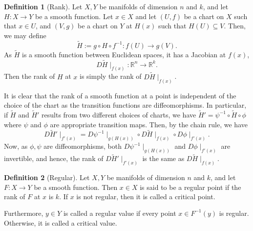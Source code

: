 \documentclass[]{article}
\theoremstyle{definition}
\theoremstyle{definition}
\newtheorem{definition}{Definition}[section]
\begin{document}
\begin{definition}[Rank]
  Let \(X, Y\) be manifolds of dimension \(n\) and \(k\), and let \(H : X \to Y\) 
  be a smooth function. Let \(x \in X\) and let \((U, f)\) be a chart on \(X\) 
  such that \(x \in U\), and \((V, g)\) be a chart on \(Y\) at \(H(x)\) such 
  that \(H(U) \subseteq V\). Then, we may define 
  \[\tilde H := g \circ H \circ f^{-1} : f(U) \to g(V).\]
  As \(\tilde H\) is a smooth function between Euclidean spaces, it has 
  a Jacobian at \(f(x)\), 
  \[D \tilde H \mid_{f(x)} : \mathbb{R}^n \to \mathbb{R}^k.\]  
  Then the rank of \(H\) at \(x\) is simply the rank of \(D \tilde H \mid_{f(x)}\).
\end{definition}

It is clear that the rank of a smooth function at a point is independent of the 
choice of the chart as the transition functions are diffeomorphisms. In particular, 
if \(\tilde H\) and \(\tilde H'\) results from two different choices of charts, we 
have \(\tilde H' = \psi^{-1} \circ \tilde H \circ \phi\) where \(\psi\) and 
\(\phi\) are appropriate transition maps. Then, by the chain rule, we have 
\[D \tilde H' \mid_{f'(x)} = D\psi^{-1} \mid_{g(H(x))} \circ D 
  \tilde H\mid_{f(x)} \circ D \phi\mid_{f'(x)}.\]
Now, as \(\phi, \psi\) are diffeomorphisms, both \(D\psi^{-1} \mid_{g(H(x))}\) 
and \(D \phi\mid_{f'(x)}\) are invertible, and hence, the rank of 
\(D \tilde H' \mid_{f'(x)}\) is the same as \(D \tilde H \mid_{f(x)}\).

\begin{definition}[Regular]
  Let \(X, Y\) be manifolds of dimension \(n\) and \(k\), and let \(F : X \to Y\) 
  be a smooth function. Then \(x \in X\) is said to be a regular point if the 
  rank of \(F\) at \(x\) is \(k\). If \(x\) is not regular, then it is 
  called a critical point.

  Furthermore, \(y\in Y\) is called a regular value if every point 
  \(x \in F^{-1}(y)\) is regular. Otherwise, it is called a critical value.
\end{definition}
\end{document}

